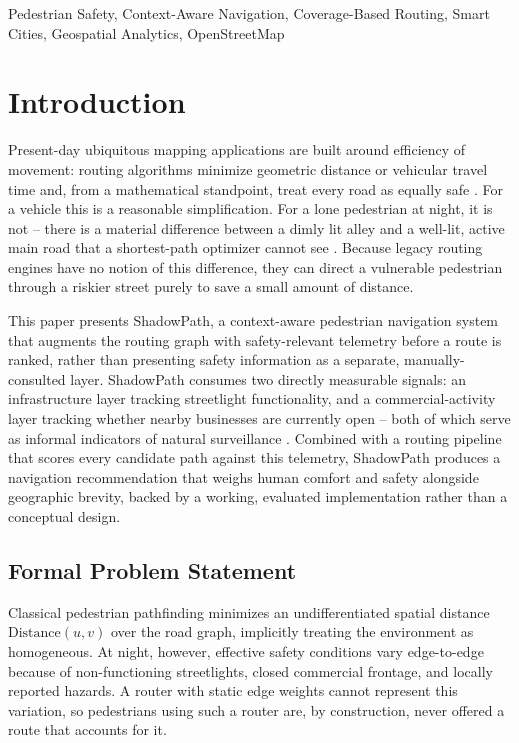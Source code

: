 \documentclass[conference]{IEEEtran}
\begin{document}
\begin{IEEEkeywords}
Pedestrian Safety, Context-Aware Navigation, Coverage-Based Routing, Smart Cities, Geospatial Analytics, OpenStreetMap
\end{IEEEkeywords}

\section{Introduction}

Present-day ubiquitous mapping applications are built around efficiency of movement: routing algorithms minimize geometric distance or vehicular travel time and, from a mathematical standpoint, treat every road as equally safe \cite{osmwiki}. For a vehicle this is a reasonable simplification. For a lone pedestrian at night, it is not -- there is a material difference between a dimly lit alley and a well-lit, active main road that a shortest-path optimizer cannot see \cite{welsh2008}. Because legacy routing engines have no notion of this difference, they can direct a vulnerable pedestrian through a riskier street purely to save a small amount of distance.

This paper presents ShadowPath, a context-aware pedestrian navigation system that augments the routing graph with safety-relevant telemetry before a route is ranked, rather than presenting safety information as a separate, manually-consulted layer. ShadowPath consumes two directly measurable signals: an infrastructure layer tracking streetlight functionality, and a commercial-activity layer tracking whether nearby businesses are currently open -- both of which serve as informal indicators of natural surveillance \cite{chalfin2022}. Combined with a routing pipeline that scores every candidate path against this telemetry, ShadowPath produces a navigation recommendation that weighs human comfort and safety alongside geographic brevity, backed by a working, evaluated implementation rather than a conceptual design.

\subsection{Formal Problem Statement}
Classical pedestrian pathfinding minimizes an undifferentiated spatial distance $\text{Distance}(u,v)$ over the road graph, implicitly treating the environment as homogeneous. At night, however, effective safety conditions vary edge-to-edge because of non-functioning streetlights, closed commercial frontage, and locally reported hazards. A router with static edge weights cannot represent this variation, so pedestrians using such a router are, by construction, never offered a route that accounts for it.
\end{document}
